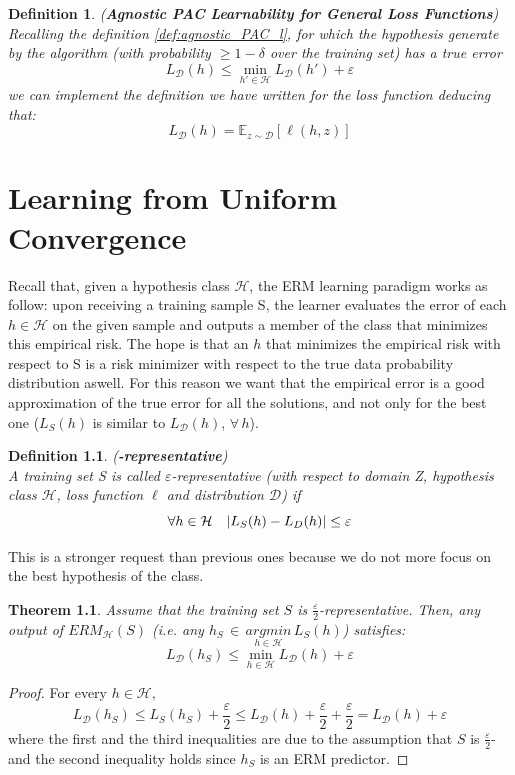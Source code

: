\documentclass[12pt]{report}
\theoremstyle{plain}
\newtheorem{THEO}{Theorem}
\newtheorem{DEF}{Definition}
\newcommand\mcl[1]{\mathcal{#1}}
\begin{document}
\begin{flushleft}
\begin{DEF} (\textbf{Agnostic PAC Learnability for General Loss Functions})\\
Recalling the definition \ref{def:agnostic_PAC_l}, for which the hypothesis generate by the algorithm (with probability $\geq 1-\delta$ over the training set) has a true error
\[ L_\mcl{D}(h)\leq\min_{h'\in\mcl{H}}L_\mcl{D}(h')+\varepsilon \]
we can implement the definition we have written for the loss function deducing that:
\[ L_\mcl{D}(h) = \mathds{E}_{z\sim\mcl{D}}\left[\ell(h,z)\right] \]
\end{DEF}


\chapter{Learning from Uniform Convergence}

Recall that, given a hypothesis class $\mcl{H}$, the ERM learning paradigm works as follow: upon receiving a training sample S, the learner evaluates the error of each $h\in\mcl{H}$ on the given sample and outputs a member of the class that minimizes this empirical risk. The hope is that an $h$ that minimizes the empirical risk with respect to S is a risk minimizer with respect to the true data probability distribution aswell. For this reason we want that the empirical error is a good approximation of the true error for all the solutions, and not only for the best one ($L_S(h)$ is similar to $L_\mcl{D}(h)$, $\forall\, h$).\\
\begin{DEF} (\bm{$\varepsilon$}\textbf{-representative})\\
A training set S is called $\varepsilon$-representative (with respect to domain Z, hypothesis class $\mcl{H}$, loss function $\ell$ and distribution $\mcl{D}$) if 
\[ \forall h\in\mcl{H} \quad \abs{L_S(h)-L_D(h)}\leq\varepsilon \]
\end{DEF}  

This is a stronger request than previous ones because we do not more focus on the best hypothesis of the class.\\

\begin{THEO}
	Assume that the training set $S$ is $\frac{\varepsilon}{2}$-representative. Then, any output of $ERM_\mcl{H}(S)$ (i.e. any $h_S\,\in\,\underset{h\in\mcl{H}}{argmin}\, L_S(h)$) satisfies:
	\[ L_\mcl{D}(h_S)\leq\min_{h\in\mcl{H}} L_\mcl{D}(h)+\varepsilon  \]
\end{THEO} 
\begin{proof}
	For every $h\in\mcl{H},$
	\[ L_\mcl{D}(h_S)\leq L_S(h_S)+\frac{\varepsilon}{2}\leq L_\mcl{D}(h)+\frac{\varepsilon}{2}+\frac{\varepsilon}{2} = L_\mcl{D}(h) + \varepsilon\]
	where the first and the third inequalities are due to the assumption that $S$ is $\frac{\varepsilon}{2}$- and the second inequality holds since $h_S$ is an ERM predictor. 
\end{proof}


\end{flushleft}
\end{document}
